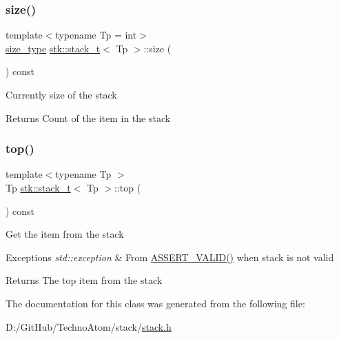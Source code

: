 \subsubsection{\texorpdfstring{size()}{size()}}
{\footnotesize\ttfamily template$<$typename Tp = int$>$ \\
\hyperlink{classstk_1_1stack__t_a591d5ffc540c9f27e5618f9aa4d67cad}{size\+\_\+type} \hyperlink{classstk_1_1stack__t}{stk\+::stack\+\_\+t}$<$ Tp $>$\+::size (\begin{DoxyParamCaption}{ }\end{DoxyParamCaption}) const\hspace{0.3cm}{\ttfamily [inline]}}

Currently size of the stack \begin{DoxyReturn}{Returns}
Count of the item in the stack 
\end{DoxyReturn}
\mbox{\label{classstk_1_1stack__t_a8850aa2ebf5ab0be43549a49b4d24339}} 
\subsubsection{\texorpdfstring{top()}{top()}}
{\footnotesize\ttfamily template$<$typename Tp $>$ \\
Tp \hyperlink{classstk_1_1stack__t}{stk\+::stack\+\_\+t}$<$ Tp $>$\+::top (\begin{DoxyParamCaption}{ }\end{DoxyParamCaption}) const}

Get the item from the stack 
\begin{DoxyExceptions}{Exceptions}
{\em std\+::exception} & From \hyperlink{stack_8h_a4ad7af85cae2910ffcf6bfbcb8278886}{A\+S\+S\+E\+R\+T\+\_\+\+V\+A\+L\+I\+D()} when stack is not valid \\
\hline
\end{DoxyExceptions}
\begin{DoxyReturn}{Returns}
The top item from the stack 
\end{DoxyReturn}


The documentation for this class was generated from the following file\+:\begin{DoxyCompactItemize}
\item 
D\+:/\+Git\+Hub/\+Techno\+Atom/stack/\hyperlink{stack_8h}{stack.\+h}\end{DoxyCompactItemize}

